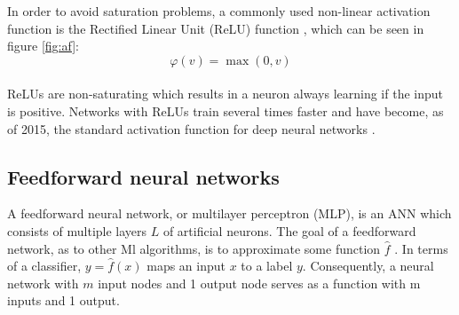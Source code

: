 In order to avoid saturation problems, a commonly used non-linear activation function is the Rectified Linear Unit (ReLU) function \cite{Nair:2010:RLU:3104322.3104425}, which can be seen in figure \ref{fig:af}:\\

\begin{equation}
  \varphi(v) = \max(0, v)
\end{equation}
\\
ReLUs are non-saturating which results in a neuron always learning if the input is positive. Networks with ReLUs train several times faster and have become, as of 2015, the standard activation function for deep neural networks \cite{lecun2015deep}.

\subsection{Feedforward neural networks}
A feedforward neural network, or multilayer perceptron (MLP), is an ANN which consists of multiple layers $L$ of artificial neurons. The goal of a feedforward network, as to other Ml algorithms, is to approximate some function $\hat f$ \cite{Goodfellow-et-al-2016}. In terms of a classifier, $y= \hat f(x)$ maps an input $x$ to a label $y$. Consequently, a neural network with $m$ input nodes and 1 output node serves as a function with m inputs and 1 output.

